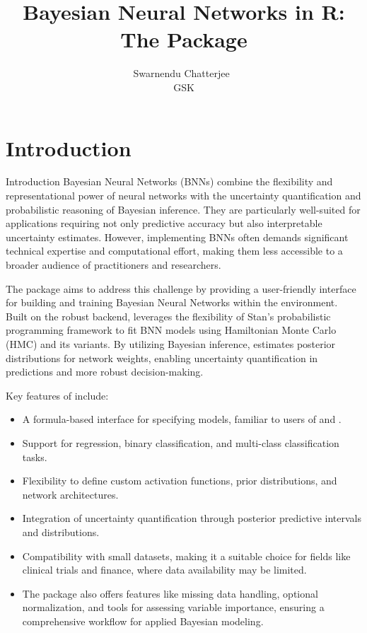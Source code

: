 \documentclass[
]{jss}
\author{
Swarnendu Chatterjee~\orcidlink{0000-0000-0000-0000}\\GSK
}
\title{Bayesian Neural Networks in R: The \pkg{bnns} Package}
\providecommand{\tightlist}{%
  \setlength{\itemsep}{0pt}\setlength{\parskip}{0pt}}
\begin{document}
\section{Introduction}\label{introduction}

Introduction Bayesian Neural Networks (BNNs) combine the flexibility and
representational power of neural networks with the uncertainty
quantification and probabilistic reasoning of Bayesian inference. They
are particularly well-suited for applications requiring not only
predictive accuracy but also interpretable uncertainty estimates.
However, implementing BNNs often demands significant technical expertise
and computational effort, making them less accessible to a broader
audience of practitioners and researchers.

The  package aims to address this challenge by providing a
user-friendly interface for building and training Bayesian Neural
Networks within the  environment. Built on the robust
 backend,  leverages the flexibility of Stan's
probabilistic programming framework to fit BNN models using Hamiltonian
Monte Carlo (HMC) and its variants. By utilizing Bayesian inference,
 estimates posterior distributions for network weights,
enabling uncertainty quantification in predictions and more robust
decision-making.

Key features of  include:

\begin{itemize}
\tightlist
\item
  A formula-based interface for specifying models, familiar to users of
   and .
\item
  Support for regression, binary classification, and multi-class
  classification tasks.
\item
  Flexibility to define custom activation functions, prior
  distributions, and network architectures.
\item
  Integration of uncertainty quantification through posterior predictive
  intervals and distributions.
\item
  Compatibility with small datasets, making it a suitable choice for
  fields like clinical trials and finance, where data availability may
  be limited.
\item
  The  package also offers features like missing data
  handling, optional normalization, and tools for assessing variable
  importance, ensuring a comprehensive workflow for applied Bayesian
  modeling.
\end{itemize}
\end{document}
